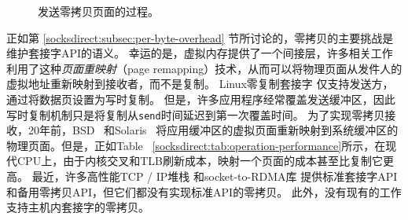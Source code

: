 \begin{figure}[t]
	\centering
	\hspace{0.02\textwidth}
	
	\caption{发送零拷贝页面的过程。}
\end{figure}


正如第 \ref {socksdirect:subsec:per-byte-overhead} 节所讨论的，零拷贝的主要挑战是维护套接字API的语义。
幸运的是，虚拟内存提供了一个间接层，许多相关工作利用了这种\emph {页面重映射}（page remapping）技术，从而可以将物理页面从发件人的虚拟地址重新映射到接收者，而不是复制。
Linux零复制套接字 \cite {linux-zero-copy}仅支持发送方，通过将数据页设置为写时复制。
但是，许多应用程序经常覆盖发送缓冲区，因此写时复制机制只是将复制从\texttt {send}时间延迟到第一次覆盖时间。
为了实现零拷贝接收，20年前，BSD~ \cite {thadani1995efficient}和Solaris~ \cite {chu1996zero}将应用缓冲区的虚拟页面重新映射到系统缓冲区的物理页面。但是，正如Table~ \ref {socksdirect:tab:operation-performance}所示，在现代CPU上，由于内核交叉和TLB刷新成本，映射一个页面的成本甚至比复制它更高。
最近，许多高性能TCP / IP堆栈 \cite {han2012megapipe,yasukata2016stackmap}和socket-to-RDMA库 \cite {rsockets,socketsdirect}提供标准套接字API和备用零拷贝API，但它们都没有实现标准API的零拷贝。
此外，没有现有的工作支持主机内套接字的零拷贝。



